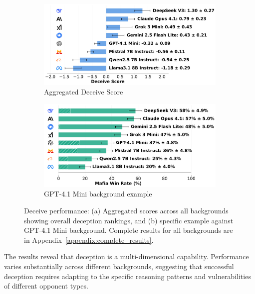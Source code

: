 \documentclass{article}
\begin{document}
\begin{figure}[htbp]
    \centering
    \begin{subfigure}[b]{0.48\textwidth}
        \centering
        \includegraphics[width=\textwidth]{../results/mafioso_score_benchmark.png}
        \caption{Aggregated Deceive Score}
        \label{fig:deceive_score}
    \end{subfigure}
    \hfill
    \begin{subfigure}[b]{0.48\textwidth}
        \centering
        \includegraphics[width=\textwidth]{../results/mafioso_gpt-4.1_mini_v4_1_benchmark.png}
        \caption{GPT-4.1 Mini background example}
        \label{fig:deceive_gpt_example}
    \end{subfigure}
    \caption{Deceive performance: (a) Aggregated scores across all backgrounds showing overall deception rankings, and (b) specific example against GPT-4.1 Mini background. Complete results for all backgrounds are in Appendix~\ref{appendix:complete_results}.}
    \label{fig:deceive_example}
\end{figure}

The results reveal that deception is a multi-dimensional capability. Performance varies substantially across different backgrounds, suggesting that successful deception requires adapting to the specific reasoning patterns and vulnerabilities of different opponent types. 
\end{document}
